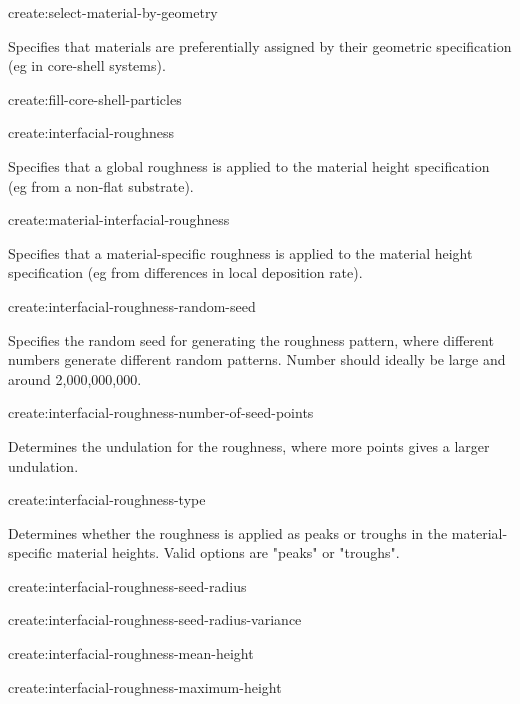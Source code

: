 {\zicf create:select-material-by-geometry} Specifies that materials are preferentially assigned by their geometric specification (eg in core-shell systems).

{\zicf create:fill-core-shell-particles}

{\zicf create:interfacial-roughness} Specifies that a global roughness is applied to the material height specification (eg from a non-flat substrate).

{\zicf create:material-interfacial-roughness} Specifies that a material-specific roughness is applied to the material height specification (eg from differences in local deposition rate).

{\zicf create:interfacial-roughness-random-seed} Specifies the random seed for generating the roughness pattern, where different numbers generate different random patterns. Number should ideally be large and around 2,000,000,000.

{\zicf create:interfacial-roughness-number-of-seed-points} Determines the undulation for the roughness, where more points gives a larger undulation.

{\zicf create:interfacial-roughness-type} Determines whether the roughness is applied as peaks or troughs in the material-specific material heights. Valid options are "peaks" or "troughs".

{\zicf create:interfacial-roughness-seed-radius}

{\zicf create:interfacial-roughness-seed-radius-variance}

{\zicf create:interfacial-roughness-mean-height}

{\zicf create:interfacial-roughness-maximum-height}

